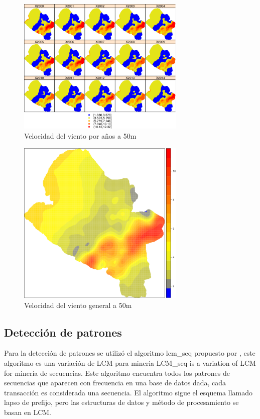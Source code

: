 \begin{figure}
  \centering
  \includegraphics[width = 8cm]{anios.pdf}
  \caption{Velocidad del viento por años a 50m}
  \label{fig:anios}
\end{figure}

\begin{figure}
  \centering
  \includegraphics[width = 8cm]{total.pdf}
  \caption{Velocidad del viento general a 50m}
  \label{fig:total}
\end{figure}



\subsection{Detección de patrones}

Para la detección de patrones se utilizó el algoritmo lcm\_seq propuesto por \cite{uno_lcm_seq},
este algoritmo es una variación de LCM para mineria
LCM\_seq is a variation of LCM for minería de secuencias. 
Este algoritmo encuentra todos los patrones de secuencias que aparecen con frecuencia
en una base de datos dada, cada transacción es considerada una secuencia. El algoritmo sigue el esquema 
llamado lapso de prefijo, pero las estructuras de datos y método de procesamiento se basan en LCM.


